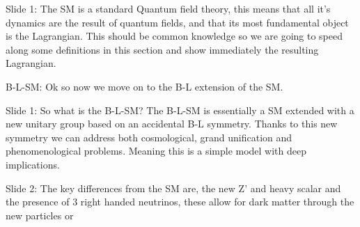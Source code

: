 Slide 1: 
The SM is a standard Quantum field theory, this means that all it’s dynamics are the result of quantum fields, and that its most fundamental object is the Lagrangian. This should be common knowledge so we are going to speed along some definitions in this section and show immediately the resulting Lagrangian.



B-L-SM:
Ok so now we move on to the B-L extension of the SM. 

Slide 1:
So what is the B-L-SM? The B-L-SM is essentially a SM extended with a new unitary group based on an accidental B-L symmetry.  Thanks to this new symmetry we can address both cosmological, grand unification and phenomenological problems. Meaning this is a simple model with deep implications. 

Slide 2: 
The key differences from the SM are, the new Z’ and heavy scalar and the presence of 3 right handed neutrinos, these allow for dark matter through the new particles or 
